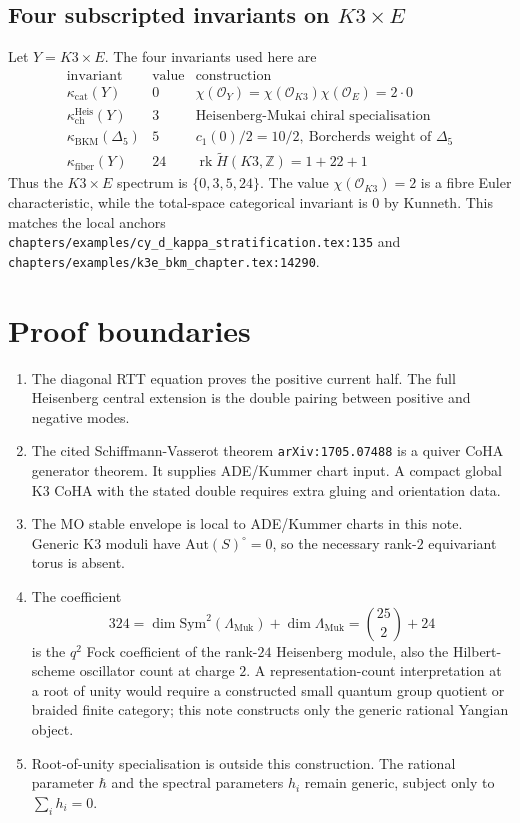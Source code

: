 \documentclass[11pt]{article}
\theoremstyle{definition}
\newcommand{\Z}{\mathbb{Z}}
\newcommand{\Lmuk}{\Lambda_{\mathrm{Muk}}}
\newcommand{\Sym}{\mathrm{Sym}}
\newcommand{\Aut}{\mathrm{Aut}}
\begin{document}
\subsection{Four subscripted invariants on $K3\times E$}

Let $Y=K3\times E$. The four invariants used here are
\[
\begin{array}{c|c|l}
\text{invariant} & \text{value} & \text{construction}\\ \hline
\kappa_{\mathrm{cat}}(Y) & 0 &
\chi(\mathcal O_Y)=\chi(\mathcal O_{K3})\chi(\mathcal O_E)=2\cdot0\\
\kappa_{\mathrm{ch}}^{\mathrm{Heis}}(Y) & 3 &
\text{Heisenberg-Mukai chiral specialisation}\\
\kappa_{\mathrm{BKM}}(\Delta_5) & 5 &
c_1(0)/2=10/2,\ \text{Borcherds weight of }\Delta_5\\
\kappa_{\mathrm{fiber}}(Y) & 24 &
\operatorname{rk}\widetilde H(K3,\Z)=1+22+1
\end{array}
\]
Thus the $K3\times E$ spectrum is $\{0,3,5,24\}$. The value
$\chi(\mathcal O_{K3})=2$ is a fibre Euler characteristic, while the
total-space categorical invariant is $0$ by Kunneth. This matches the
local anchors
\texttt{chapters/examples/cy\_d\_kappa\_stratification.tex:135} and
\texttt{chapters/examples/k3e\_bkm\_chapter.tex:14290}.

\section{Proof boundaries}
\label{sec:proof-boundaries}

\begin{enumerate}
\item The diagonal RTT equation proves the positive current half. The
full Heisenberg central extension is the double pairing between positive
and negative modes.

\item The cited Schiffmann-Vasserot theorem
\texttt{arXiv:1705.07488} is a quiver CoHA generator theorem. It supplies
ADE/Kummer chart input. A compact global K3 CoHA with the stated double
requires extra gluing and orientation data.

\item The MO stable envelope is local to ADE/Kummer charts in this note.
Generic K3 moduli have $\Aut(S)^\circ=0$, so the necessary rank-$2$
equivariant torus is absent.

\item The coefficient
\[
  324=\dim\Sym^2(\Lmuk)+\dim\Lmuk=\binom{25}{2}+24
\]
is the $q^2$ Fock coefficient of the rank-$24$ Heisenberg module, also
the Hilbert-scheme oscillator count at charge $2$. A representation-count
interpretation at a root of unity would require a constructed small
quantum group quotient or braided finite category; this note constructs
only the generic rational Yangian object.

\item Root-of-unity specialisation is outside this construction. The rational parameter
$\hbar$ and the spectral parameters $h_i$ remain generic, subject only to
$\sum_i h_i=0$.
\end{enumerate}
\end{document}
